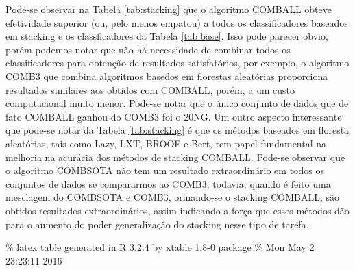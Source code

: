 \documentclass[]{article}
\begin{document}
Pode-se observar na Tabela \ref{tab:stacking} que o algoritmo COMBALL
obteve efetividade superior (ou, pelo menos empatou) a todos os
classificadores baseados em stacking e os classficadores da Tabela
\ref{tab:base}. Isso pode parecer obvio, porém podemos notar que não há
necessidade de combinar todos os classificadores para obtenção de
resultados satisfatórios, por exemplo, o algoritmo COMB3 que combina
algoritmos basedos em florestas aleatórias proporciona resultados
similares aos obtidos com COMBALL, porém, a um custo computacional muito
menor. Pode-se notar que o único conjunto de dados que de fato COMBALL
ganhou do COMB3 foi o 20NG. Um outro aspecto interessante que pode-se
notar da Tabela \ref{tab:stacking} é que os métodos baseados em floresta
aleatórias, tais como Lazy, LXT, BROOF e Bert, tem papel fundamental na
melhoria na acurácia dos métodos de stacking COMBALL. Pode-se observar
que o algoritmo COMBSOTA não tem um resultado extraordinário em todos os
conjuntos de dados se compararmos ao COMB3, todavia, quando é feito uma
mesclagem do COMBSOTA e COMB3, orinando-se o stacking COMBALL, são
obtidos resultados extraordinários, assim indicando a força que esses
métodos dão para o aumento do poder generalização do stacking nesse tipo
de tarefa.

\% latex table generated in R 3.2.4 by xtable 1.8-0 package \% Mon May 2
23:23:11 2016
\end{document}
